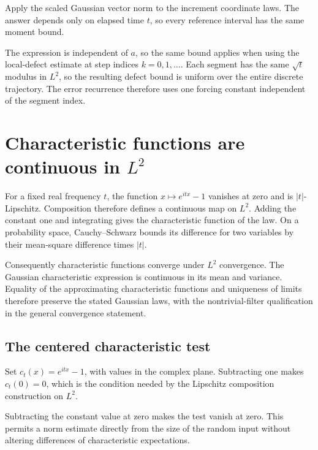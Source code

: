 \documentclass[11pt,a4paper]{report}
\begin{document}
Apply the scaled Gaussian vector norm to the increment coordinate laws. The answer depends only on elapsed time \(t\), so every reference interval has the same moment bound.



The expression is independent of \(a\), so the same bound applies when using the local-defect estimate at step indices \(k=0,1,\ldots\). Each segment has the same \(\sqrt t\) modulus in \(L^2\), so the resulting defect bound is uniform over the entire discrete trajectory. The error recurrence therefore uses one forcing constant independent of the segment index.

\section{\texorpdfstring{Characteristic functions are continuous in \(L^2\)}{Characteristic functions are continuous in L²}}
\label{proof-module-UnadjustedLangevin-LpCharacteristic-lean}


For a fixed real frequency \(t\), the function \(x\mapsto e^{itx}-1\) vanishes at zero and is \(|t|\)-Lipschitz. Composition therefore defines a continuous map on \(L^2\). Adding the constant one and integrating gives the characteristic function of the law. On a probability space, Cauchy–Schwarz bounds its difference for two variables by their mean-square difference times \(|t|\).



Consequently characteristic functions converge under \(L^2\) convergence. The Gaussian characteristic expression is continuous in its mean and variance. Equality of the approximating characteristic functions and uniqueness of limits therefore preserve the stated Gaussian laws, with the nontrivial-filter qualification in the general convergence statement.

\subsection{\texorpdfstring{The centered characteristic test}{The centered characteristic test}}
\label{report-step-UnadjustedLangevin-LpCharacteristic-lean-1}


Set \(c_t(x)=e^{itx}-1\), with values in the complex plane. Subtracting one makes \(c_t(0)=0\), which is the condition needed by the Lipschitz composition construction on \(L^2\).



Subtracting the constant value at zero makes the test vanish at zero. This permits a norm estimate directly from the size of the random input without altering differences of characteristic expectations.
\end{document}
